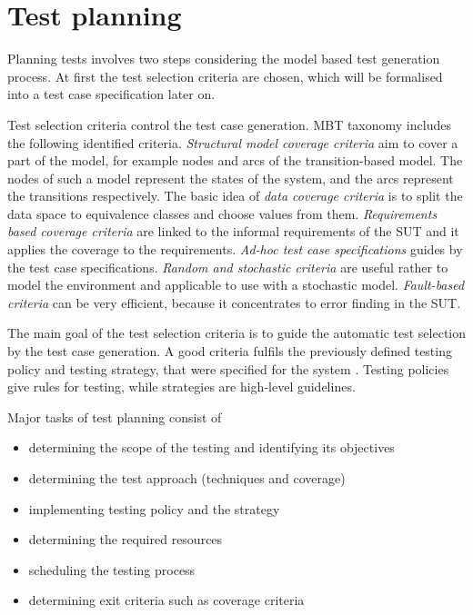 

\section{Test planning}
\label{sec:testplanning}

Planning tests involves two steps considering the model based test generation process. At first the test selection criteria are chosen, which will be formalised into a test case specification later on.

Test selection criteria control the test case generation. MBT taxonomy includes the following identified criteria. \textit{Structural model coverage criteria} aim to cover a part of the model, for example nodes and arcs of the transition-based model. The nodes of such a model represent the states of the system, and the arcs represent the transitions respectively. The basic idea of \textit{data coverage criteria} is to split the data space to equivalence classes and choose values from them. \textit{Requirements based coverage criteria} are linked to the informal requirements of the SUT and it applies the coverage to the requirements. \textit{Ad-hoc test case specifications} guides by the test case specifications. \textit{Random and stochastic criteria} are useful rather to model the environment and applicable to use with a stochastic model. \textit{Fault-based criteria} can be very efficient, because it concentrates to error finding in the SUT.

The main goal of the test selection criteria is to guide the automatic test selection by the test case generation. A good criteria fulfils the previously defined testing policy and testing strategy, that were specified for the system \cite{istqb}. Testing policies give rules for testing, while strategies are high-level guidelines.

Major tasks of test planning consist of

\begin{itemize}
	\item determining the scope of the testing and identifying its objectives
	\item determining the test approach (techniques and coverage)
	\item implementing testing policy and the strategy
	\item determining the required resources
	\item scheduling the testing process
	\item determining exit criteria such as coverage criteria
\end{itemize}

